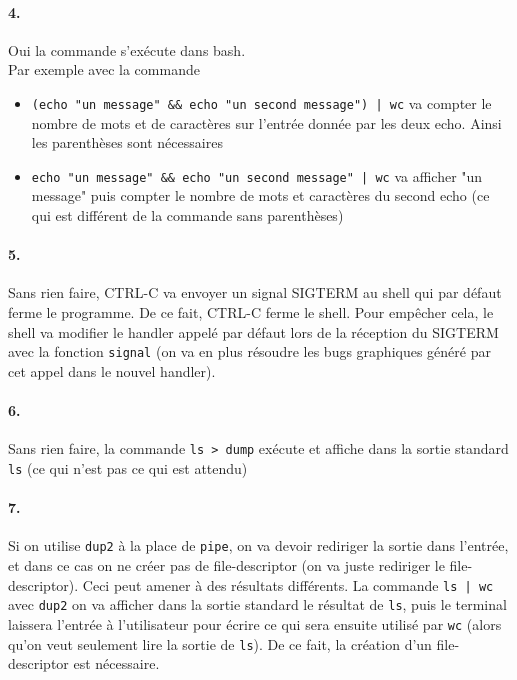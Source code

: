 \documentclass{report}
\begin{document}
\paragraph{4.}
Oui la commande s'exécute dans bash. \\
Par exemple avec la commande 
\begin{itemize}
  \item \verb$(echo "un message" && echo "un second message") | wc$ va compter le nombre de mots et de caractères sur l'entrée donnée par les deux echo. Ainsi les parenthèses sont nécessaires 
  \item \verb$echo "un message" && echo "un second message" | wc$ va afficher "un message" puis compter le nombre de mots et caractères du second echo (ce qui est différent de la commande sans parenthèses)
\end{itemize}

\paragraph{5.}
Sans rien faire, CTRL-C va envoyer un signal SIGTERM au shell qui par défaut ferme le programme. De ce fait, CTRL-C ferme le shell. Pour empêcher cela, le shell va modifier le handler appelé par défaut lors de la réception du SIGTERM avec la fonction \verb|signal| (on va en plus résoudre les bugs graphiques généré par cet appel dans le nouvel handler). 

\paragraph{6.}
Sans rien faire, la commande \verb|ls > dump| exécute et affiche dans la sortie standard \verb|ls| (ce qui n'est pas ce qui est attendu)

\paragraph{7.}
Si on utilise \verb|dup2| à la place de \verb|pipe|, on va devoir rediriger la sortie dans l'entrée, et dans ce cas on ne créer pas de file-descriptor (on va juste rediriger le file-descriptor). Ceci peut amener à des résultats différents. La commande \verb$ls | wc$ avec \verb|dup2| on va afficher dans la sortie standard le résultat de \verb|ls|, puis le terminal laissera l'entrée à l'utilisateur pour écrire ce qui sera ensuite utilisé par \verb|wc| (alors qu'on veut seulement lire la sortie de \verb|ls|). De ce fait, la création d'un file-descriptor est nécessaire.
\end{document}
